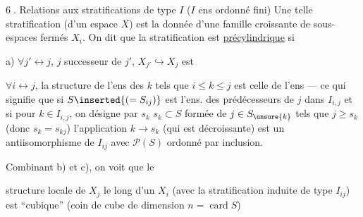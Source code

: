 \textcircled{6.} Relations aux stratifications de type $I$
($I$ ens ordonné fini)
Une telle stratification (d'un espace $X$) est
la donnée d'une famille croissante de
sous-espaces fermés $X_i$. On dit que
la stratification est \uline{précylindrique} si

a) $\forall j'\leftrightarrow j$, $j$ successeur de $j'$,
$X_{j'}\hookrightarrow X_j$ est
 



$\forall i\leftrightarrow j$, la structure de l'ens 
des $k$ tels que $i\le k\le j$ est celle de l'ens
  --- ce qui signifie que
si $S\inserted{(=S_{ij})}$ est l'ens. des prédécesseurs de $j$ dans
$I_{i,j}$ 
et si pour \unsure{$\forall$} $k\in I_{i,j}$, on désigne
 par $s_k$   $s_k\subset S$ formée
de $j\in S_{\unsure{k}}$ tels que
$j\ge s_k$ (donc $s_k=s_{kj}$)
l'application $k\longrightarrow s_k$ (qui est décroissante)
est un antiisomorphisme de $I_{ij}$ avec $\mathcal P(S)$
ordonné par inclusion. 




Combinant b) et c), on voit que le

structure locale de $X_j$ le long d'un $X_i$
(avec la stratification induite de type $I_{ij}$)
est ``cubique''
(coin de cube de
dimension $n=\operatorname{card}S$)

